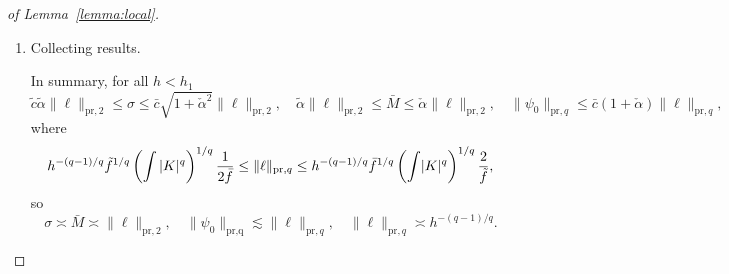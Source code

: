 \begin{proof}[of Lemma~\ref{lemma:local}]
\begin{enumerate}
    Consider the change of variables $u=(v'-v)/h$ so that $\mathsf{d} u  = h^{-1} \mathsf{d} v'$. Hence
    \begin{align*}
        \| \ell\|^q_{\text{pr},q} \omega^q &=
        \| \ell  \omega\|^q_{\text{pr},q} \\
        &=  \left\| h^{-1} K \left(\frac{v-v'}{h}\right) \right\|^q_{\text{pr},q} \\
        &= \int h^{-q}\left|K \left(\frac{v'-v}{h}\right)\right|^q f_V(v') \mathsf{d} v' \\
        &=  \int h^{-(q-1) }|K (u)|^q f_V(v - u h)  \mathsf{d} u .
    \end{align*}
It follows that
$$
 h^{-(q - 1)/q}  \tilde{f}^{1/q}  \left(\int |K|^q\right)^{1/q} 
 \leq \| \ell\|_{\text{pr},q} \omega 
 \leq  h^{-(q - 1)/q}  \bar f^{1/q}  \left(\tiny{\int} |K|^q\right)^{1/q}.
$$ 
Further, we have that
$$
\omega  = \int  h^{-1} K\left(\frac{v'-v}{h}\right) f_V(v') \mathsf{d} v' = \int   K(u) f_V(v- u h) \mathsf{d} u.
$$
Note that
$$
\int   K(u) f_V(v-0u) \mathsf{d} u=\int   K(u) f_V(v) \mathsf{d} u=f_V(v).
$$
Using the Taylor expansion in $h$ around $h=0$ and the Holder inequality, there exist some $\tilde{h}$ in $[0,h]$ such that
$$
|\omega - f_V(v)| =  \left|    h \int   K(u) \partial_v f_V(v- u \tilde h) u \mathsf{d} u \right |  \leq   h \bar f' \int |u|| K(u)| du.
$$
Hence there exists some $h_1$ in $(h,h_0)$ depending only on $(K, \bar f', \tilde{f}, \bar f)$ such that
$$ \tilde{f}/2  \leq \omega \leq 2 \bar f.$$
In summary,
$$
 h^{- (q - 1)/q}  \tilde{f}^{1/q}  \left(\int |K|^q\right)^{1/q} \frac{1}{2 \bar f} \leq \| \ell\|_{\text{pr},q}  \leq  h^{-(q - 1)/q}  \bar f^{1/q}  \left(\tiny{\int} |K|^q\right)^{1/q} \frac{2}{\tilde{f}}.
$$     
    
    \item Collecting results.

In summary, for all $h < h_1$
$$
\tilde{c}  \tilde{\alpha} \| \ell\|_{\text{pr},2}  \leq \sigma \leq \bar c \sqrt{1+ \check{\alpha}^2} \| \ell\|_{\text{pr},2}, \quad  \tilde{\alpha} \| \ell\|_{\text{pr},2}  \leq \bar{M} \leq \check{\alpha} \| \ell\|_{\text{pr},2},  \quad
\|\psi_0\|_{\text{pr},q}
\leq  \bar c (1 + \check{\alpha} ) \| \ell \|_{\text{pr},q},
$$
where
$$
 h^{- (q - 1)/q}  \tilde{f}^{1/q}  \left(\int |K|^q\right)^{1/q} \frac{1}{2 \bar f} \leq \| \ell\|_{\text{pr},q}  \leq  h^{-(q - 1)/q}  \bar f^{1/q}  \left(\tiny{\int} |K|^q\right)^{1/q} \frac{2}{\tilde{f}},
$$  
so
$$
\sigma \asymp \bar{M}\asymp \| \ell\|_{\text{pr},2},\quad \|\psi_0\|_{\text{pr,q}}\lesssim \|\ell\|_{\text{pr},q},\quad \|\ell\|_{\text{pr},q}\asymp h^{-(q-1)/q}.
$$
\end{enumerate}
\end{proof}


